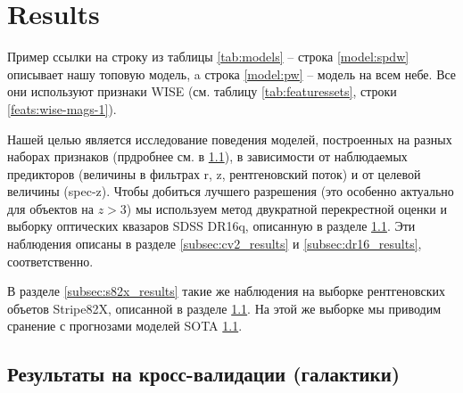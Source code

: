 \documentclass[fleqn,usenatbib]{mnras}
\begin{document}
\section{Results}
Пример ссылки на строку из таблицы \ref{tab:models} -- строка \ref{model:spdw} описывает нашу топовую модель, a строка \ref{model:pw} -- модель на всем небе. Все они используют признаки WISE (см. таблицу \ref{tab:featuressets}, строки \ref{feats:wise-mags-1}).

Нашей целью является исследование поведения моделей, построенных на разных наборах признаков (прдробнее см. в \ref{}), в зависимости от наблюдаемых предикторов (величины в фильтрах r, z, рентгеновский поток) и от целевой величины (spec-z). Чтобы добиться лучшего разрешения (это особенно актуально для объектов на $z > 3$) мы используем метод двукратной перекрестной оценки и выборку оптических квазаров SDSS DR16q, описанную в разделе \ref{}. Эти наблюдения описаны в разделе \ref{subsec:cv2_results} и \ref{subsec:dr16_results}, соответственно.

В разделе \ref{subsec:s82x_results} такие же наблюдения на выборке рентгеновских объетов Stripe82X, описанной в разделе \ref{}. На этой же выборке мы приводим сранение с прогнозами моделей SOTA \ref{}.

\subsection{Результаты на кросс-валидации (галактики)}


\end{document}
